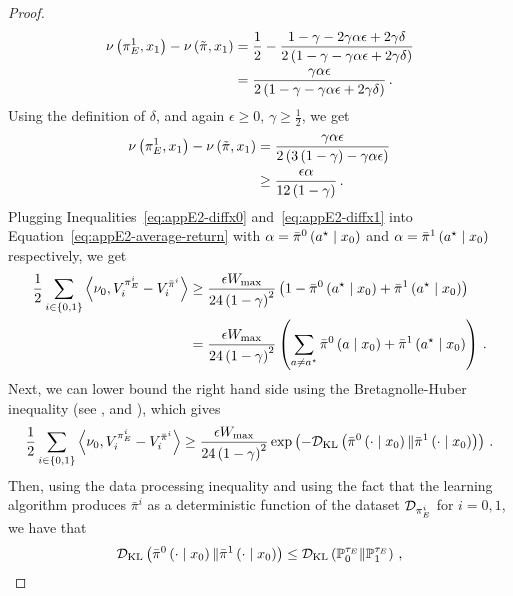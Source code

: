 \begin{proof}
\begin{align*}
        \nu \left( \pi_E^1, x_1 \right) - \nu \left( \tilde\pi, x_1 \right) &= \frac12 - \frac{1 - \gamma - 2 \gamma \alpha \epsilon + 2 \gamma \delta}{2 \left( 1 - \gamma - \gamma \alpha \epsilon + 2 \gamma \delta \right)} \\
        &= \frac{\gamma \alpha \epsilon}{2 \left( 1 - \gamma - \gamma \alpha \epsilon + 2 \gamma \delta \right)}\,.
    \end{align*}
    Using the definition of $\delta$, and again $\epsilon \geq 0$, $\gamma \geq \frac12$, we get
    \begin{align}
        \nu \left( \pi_E^1, x_1 \right) - \nu \left( \tilde\pi, x_1 \right) &= \frac{\gamma \alpha \epsilon}{2 \left( 3 \left( 1 - \gamma \right) - \gamma \alpha \epsilon \right)} \nonumber \\
        &\geq \frac{\epsilon \alpha}{12 \left( 1 - \gamma \right)}\,. \label{eq:appE2-diffx1}
    \end{align}
    Plugging Inequalities~\eqref{eq:appE2-diffx0} and~\eqref{eq:appE2-diffx1} into Equation~\eqref{eq:appE2-average-return} with $\alpha = \bar\pi^0 \left( a^\star \mathrel{}\middle|\mathrel{} x_0 \right)$ and $\alpha = \bar\pi^1 \left( a^\star \mathrel{}\middle|\mathrel{} x_0 \right)$ respectively, we get
    \begin{align*}
        \frac12 \sum_{i \in \left\{ 0, 1 \right\}} \left\langle \nu_0, V_i^{\pi_E^i} - V_i^{\bar\pi^i} \right\rangle &\geq \frac{\epsilon W_{\max}}{24 \left( 1 - \gamma \right)^2}\left( 1 - \bar\pi^0 \left( a^\star \mathrel{}\middle|\mathrel{} x_0 \right) + \bar\pi^1 \left( a^\star \mathrel{}\middle|\mathrel{} x_0 \right) \right) \\
        &= \frac{\epsilon W_{\max}}{24 \left( 1 - \gamma \right)^2} \left( \sum_{a \neq a^\star} \bar\pi^0 \left( a \mathrel{}\middle|\mathrel{} x_0 \right) + \bar\pi^1 \left( a^\star \mathrel{}\middle|\mathrel{} x_0 \right) \right)\,.
    \end{align*}
    Next, we can lower bound the right hand side using the Bretagnolle-Huber inequality (see \citealp{bretagnolle1979estimation}, and \citealp[Theorem 14.2]{lattimore2020bandit}), which gives
    \begin{equation} \label{eq:partial_lower_bound}
        \frac12 \sum_{i \in \left\{ 0, 1 \right\}} \left\langle \nu_0, V_i^{\pi_E^i} - V_i^{\bar\pi^i} \right\rangle \geq \frac{\epsilon W_{\max}}{24 \left( 1 - \gamma \right)^2} \exp \left( - \mathcal{D}_{\text{KL}} \left( \bar\pi^0 \left( \cdot \mathrel{}\middle|\mathrel{} x_0 \right) \| \bar\pi^1 \left( \cdot \mathrel{}\middle|\mathrel{} x_0 \right) \right) \right)\,.
    \end{equation}
    Then, using the data processing inequality and using the fact that the learning algorithm produces $\bar\pi^i$ as a deterministic function of the dataset $\mathcal{D}_{\pi_E^i}$ for $i = 0, 1$, we have that
    \begin{equation*}
        \KL \spr{\bar\pi^0 \spr{\cdot \given x_0} \| \bar\pi^1 \spr{\cdot \given x_0}} \leq \KL \spr{\bbP_0^{\tau_E} \| \bbP_1^{\tau_E}}\,,

\end{equation*}
\end{proof}
